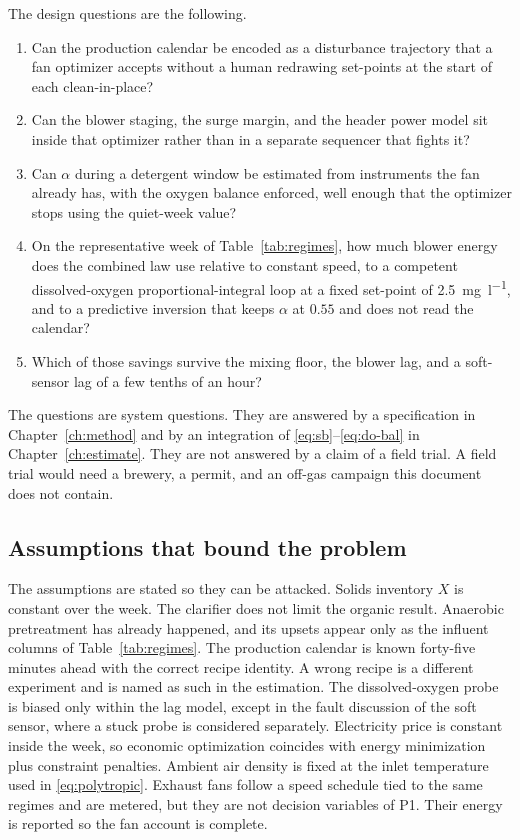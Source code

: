 The design questions are the following.

\begin{enumerate}[leftmargin=1.6em,itemsep=0.4em]
\item Can the production calendar be encoded as a disturbance trajectory that a fan optimizer accepts without a human redrawing set-points at the start of each clean-in-place?
\item Can the blower staging, the surge margin, and the header power model sit inside that optimizer rather than in a separate sequencer that fights it?
\item Can $\alpha$ during a detergent window be estimated from instruments the fan already has, with the oxygen balance enforced, well enough that the optimizer stops using the quiet-week value?
\item On the representative week of Table~\ref{tab:regimes}, how much blower energy does the combined law use relative to constant speed, to a competent dissolved-oxygen proportional-integral loop at a fixed set-point of \SI{2.5}{\milli\gram\per\litre}, and to a predictive inversion that keeps $\alpha$ at $0.55$ and does not read the calendar?
\item Which of those savings survive the mixing floor, the blower lag, and a soft-sensor lag of a few tenths of an hour?
\end{enumerate}

The questions are system questions. They are answered by a specification in Chapter~\ref{ch:method} and by an integration of \eqref{eq:sb}--\eqref{eq:do-bal} in Chapter~\ref{ch:estimate}. They are not answered by a claim of a field trial. A field trial would need a brewery, a permit, and an off-gas campaign this document does not contain.

\subsection{Assumptions that bound the problem}

The assumptions are stated so they can be attacked. Solids inventory $X$ is constant over the week. The clarifier does not limit the organic result. Anaerobic pretreatment has already happened, and its upsets appear only as the influent columns of Table~\ref{tab:regimes}. The production calendar is known forty-five minutes ahead with the correct recipe identity. A wrong recipe is a different experiment and is named as such in the estimation. The dissolved-oxygen probe is biased only within the lag model, except in the fault discussion of the soft sensor, where a stuck probe is considered separately. Electricity price is constant inside the week, so economic optimization coincides with energy minimization plus constraint penalties. Ambient air density is fixed at the inlet temperature used in \eqref{eq:polytropic}. Exhaust fans follow a speed schedule tied to the same regimes and are metered, but they are not decision variables of P1. Their energy is reported so the fan account is complete.

